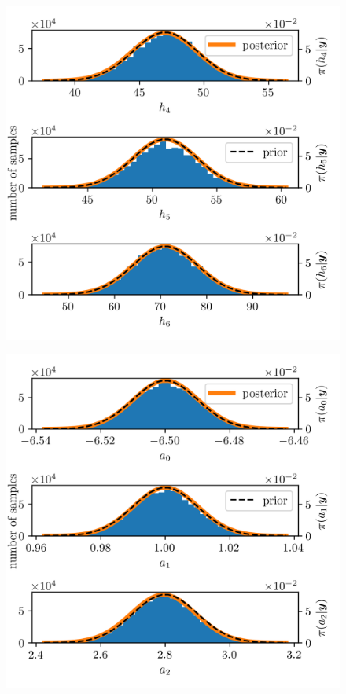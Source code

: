 \begin{figure}[ht!]
	\centering
	\includegraphics{PHdPTPost1.png}
	\caption[]{}
	\label{fig:}
\end{figure}
\begin{figure}[ht!]
	\centering
	\includegraphics{PHdPTPost2.png}
	\caption[]{}
	\label{fig:}
\end{figure}
